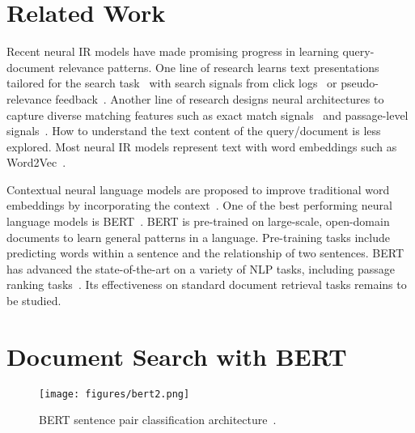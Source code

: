 \documentclass[sigconf]{acmart}
\begin{document}
%
 \section{Related Work}\label{section:related-work}



Recent neural IR models have made promising progress in learning query-document relevance patterns. One line of research learns text presentations tailored for the search task~\cite{K-NRM, dai2018convolutional, WeakNeuIR} with search signals from click logs~\cite{K-NRM, dai2018convolutional} or pseudo-relevance feedback~\cite{WeakNeuIR}. Another line of research designs neural architectures to capture diverse matching features such as exact match signals~\cite{DRMM} and passage-level signals~\cite{pang2017deeprank}. How to understand the text content of the query/document is less explored. Most neural IR models represent text with word embeddings such as Word2Vec~\cite{word2vec}. 


Contextual neural language models are proposed to improve traditional word embeddings by incorporating the context~\cite{Peters:2018, devlin2018bert}. One of the best performing neural language models is BERT~\cite{devlin2018bert}.  BERT is pre-trained on large-scale, open-domain documents to learn general patterns in a language. Pre-training tasks include predicting words within a sentence and the relationship of two sentences. BERT has advanced the state-of-the-art on a variety of NLP tasks, including passage ranking tasks~\cite{nogueira2019passage}. Its effectiveness on standard document retrieval tasks remains to be studied.



 \section{Document Search with BERT}\label{sec:model}

\begin{figure}[!t]
\centering
\texttt{[image: figures/bert2.png]}
\caption{BERT sentence pair classification architecture~\cite{devlin2018bert}. }
\label{fig:bert}
\end{figure}
\end{document}
